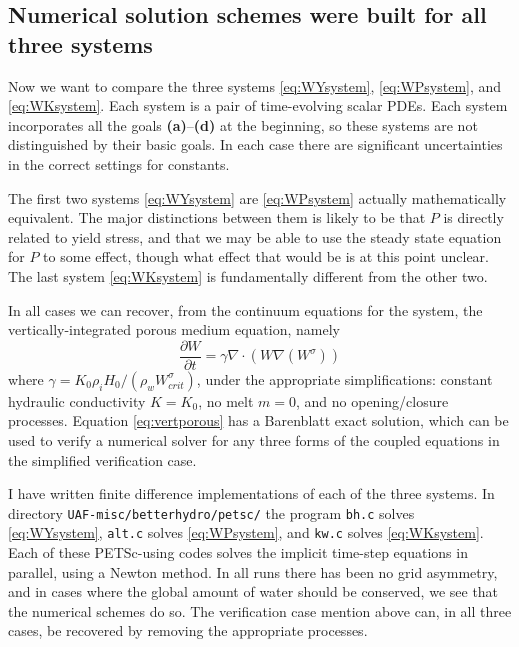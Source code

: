 \documentclass[11pt]{amsart}
\begin{document}
\subsection*{Numerical solution schemes were built for all three systems}  Now we want to compare the three systems \eqref{eq:WYsystem}, \eqref{eq:WPsystem}, and \eqref{eq:WKsystem}.  Each system is a pair of time-evolving scalar PDEs.  Each system incorporates all the goals \textbf{(a)}--\textbf{(d)} at the beginning, so these systems are not distinguished by their basic goals.  In each case there are significant uncertainties in the correct settings for constants.

The first two systems \eqref{eq:WYsystem} are \eqref{eq:WPsystem} actually mathematically equivalent.  The major distinctions between them is likely to be that $P$ is directly related to yield stress, and that we may be able to use the steady state equation for $P$ to some effect, though what effect that would be is at this point unclear.  The last system \eqref{eq:WKsystem} is fundamentally different from the other two.

In all cases we can recover, from the continuum equations for the system, the vertically-integrated porous medium equation, namely
\begin{equation} \label{eq:vertporous}
\frac{\partial W}{\partial t} = \gamma \nabla \cdot \left( W \nabla \left( W^\sigma \right) \right)
\end{equation}
where $\gamma = K_0 \rho_i H_0 / (\rho_w W_{crit}^\sigma)$, under the appropriate simplifications: constant hydraulic conductivity $K=K_0$, no melt $m=0$, and no opening/closure processes.  Equation \eqref{eq:vertporous} has a Barenblatt exact solution, which can be used to verify a numerical solver for any three forms of the coupled equations in the simplified verification case.

I have written finite difference implementations of each of the three systems.  In directory \texttt{UAF-misc/betterhydro/petsc/} the program \texttt{bh.c} solves \eqref{eq:WYsystem}, \texttt{alt.c} solves \eqref{eq:WPsystem}, and  \texttt{kw.c} solves \eqref{eq:WKsystem}.  Each of these PETSc-using codes solves the implicit time-step equations in parallel, using a Newton method.  In all runs there has been no grid asymmetry, and in cases where the global amount of water should be conserved, we see that the numerical schemes do so.  The verification case mention above can, in all three cases, be recovered by removing the appropriate processes.
\end{document}
